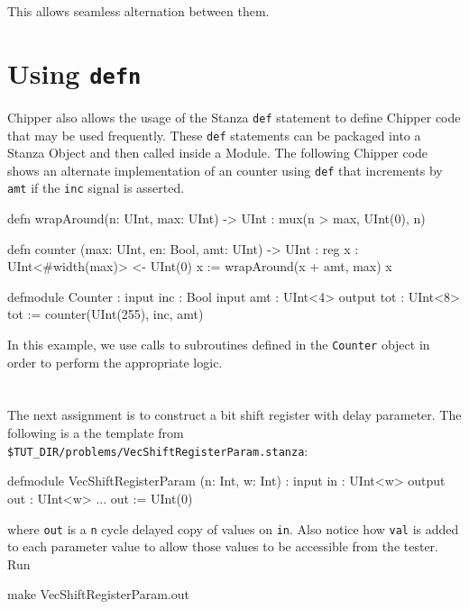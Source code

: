 This allows seamless alternation between them.

\section{Using {\tt defn}}

Chipper also allows the usage of the Stanza \verb+def+ statement to define Chipper code that may be used frequently. These \verb+def+ statements can be packaged into a Stanza Object and then called inside a Module. The following Chipper code shows an alternate implementation of an counter using \verb+def+ that increments by \verb+amt+ if the \verb+inc+ signal is asserted.

\begin{stanza} 
defn wrapAround(n: UInt, max: UInt) -> UInt :
  mux(n > max, UInt(0), n)

defn counter (max: UInt, en: Bool, amt: UInt) -> UInt :
  reg x : UInt<#{width(max)}> <- UInt(0)
  x := wrapAround(x + amt, max)
  x

defmodule Counter :
  input inc : Bool
  input amt : UInt<4>
  output tot : UInt<8>
  tot := counter(UInt(255), inc, amt)
\end{stanza}
 
\noindent
In this example, we use calls to subroutines defined in the \verb+Counter+ object in order to perform the appropriate logic. 

\section{}

The next assignment is to construct a bit shift register with delay parameter.
The following is a the template from \verb+$TUT_DIR/problems/VecShiftRegisterParam.stanza+:

\begin{stanza}
defmodule VecShiftRegisterParam (n: Int, w: Int) :
  input  in  : UInt<w>
  output out : UInt<w>
  ...
  out := UInt(0)
\end{stanza}

\noindent
where \verb+out+ is a \verb+n+ cycle delayed copy of values on \verb+in+.  
Also notice how \verb+val+ is added to each parameter value to 
allow those values to be accessible from the tester. Run 

\begin{bash}
make VecShiftRegisterParam.out
\end{bash}

